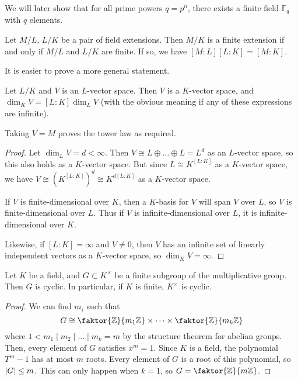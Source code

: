 We will later show that for all prime powers \( q = p^n \), there exists a finite field \( \mathbb F_q \) with \( q \) elements.
\begin{theorem}
	Let \( M / L \), \( L / K \) be a pair of field extensions.
	Then \( M / K \) is a finite extension if and only if \( M / L \) and \( L / K \) are finite.
	If so, we have \( [M:L][L:K] = [M:K] \).
\end{theorem}
It is easier to prove a more general statement.
\begin{theorem}
	Let \( L / K \) and \( V \) is an \( L \)-vector space.
	Then \( V \) is a \( K \)-vector space, and \( \dim_K V = [L:K] \dim_L V \) (with the obvious meaning if any of these expressions are infinite).
\end{theorem}
Taking \( V = M \) proves the tower law as required.
\begin{proof}
	Let \( \dim_L V = d < \infty \).
	Then \( V \cong L \oplus \dots \oplus L = L^d \) as an \( L \)-vector space, so this also holds as a \( K \)-vector space.
	But since \( L \cong K^{[L:K]} \) as a \( K \)-vector space, we have \( V \cong (K^{[L:K]})^d \cong K^{d[L:K]} \) as a \( K \)-vector space.

	If \( V \) is finite-dimensional over \( K \), then a \( K \)-basis for \( V \) will span \( V \) over \( L \), so \( V \) is finite-dimensional over \( L \).
	Thus if \( V \) is infinite-dimensional over \( L \), it is infinite-dimensional over \( K \).

	Likewise, if \( [L:K] = \infty \) and \( V \neq 0 \), then \( V \) has an infinite set of linearly independent vectors as a \( K \)-vector space, so \( \dim_K V = \infty \).
\end{proof}
\begin{proposition}
	Let \( K \) be a field, and \( G \subset K^\times \) be a finite subgroup of the multiplicative group.
	Then \( G \) is cyclic.
	In particular, if \( K \) is finite, \( K^\times \) is cyclic.
\end{proposition}
\begin{proof}
	We can find \( m_i \) such that
	\[ G \cong \faktor{\mathbb Z}{m_1\mathbb Z} \times \dots \times \faktor{\mathbb Z}{m_k \mathbb Z} \]
	where \( 1 < m_1 \mid m_2 \mid \dots \mid m_k = m \) by the structure theorem for abelian groups.
	Then, every element of \( G \) satisfies \( x^m = 1 \).
	Since \( K \) is a field, the polynomial \( T^m - 1 \) has at most \( m \) roots.
	Every element of \( G \) is a root of this polynomial, so \( \abs{G} \leq m \).
	This can only happen when \( k = 1 \), so \( G = \faktor{\mathbb Z}{m\mathbb Z} \).
\end{proof}
